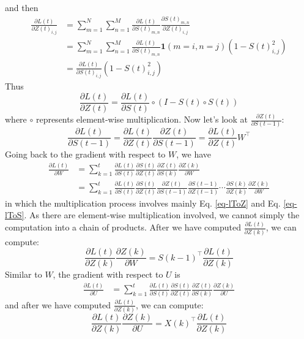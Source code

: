 \documentclass{article}
\begin{document}
and then 
\begin{align}
    \frac{\partial L(t)}{\partial Z(t)_{i, j}} 
    &= \sum_{m=1}^N\sum_{n=1}^M
    \frac{\partial L(t)}{\partial S(t)_{m, n}}
    \frac{\partial S(t)_{m, n}}{\partial Z(t)_{i, j}} \\
    &= \sum_{m=1}^N\sum_{n=1}^M
    \frac{\partial L(t)}{\partial S(t)_{m, n}}
    \mathbf{1}(m=i, n=j)(1 - S(t)_{i, j}^2) \\
    &= \frac{\partial L(t)}{\partial S(t)_{i, j}}
    (1 - S(t)_{i, j}^2)
\end{align}
Thus 
\begin{equation} \label{eq-lToZ}
    \frac{\partial L(t)}{\partial Z(t)} 
    = \frac{\partial L(t)}{\partial S(t)} \circ (I - S(t) \circ S(t))
\end{equation}
where $\circ$ represents element-wise multiplication. Now let's look at $\frac{\partial Z(t)}{\partial S(t-1)}$:
\begin{equation} \label{eq-lToS}
    \frac{\partial L(t)}{\partial S(t-1)} = \frac{\partial L(t)}{\partial Z(t)}\frac{\partial Z(t)}{\partial S(t-1)} = \frac{\partial L(t)}{\partial Z(t)}W^\top
\end{equation}
Going back to the gradient with respect to $W$, we have
\begin{align}
    \frac{\partial L(t)}{\partial W} 
    &= \sum_{k=1}^t 
    \frac{\partial L(t)}{\partial S(t)}
    \frac{\partial S(t)}{\partial Z(t)}
    \frac{\partial Z(t)}{\partial S(k)}
    \frac{\partial Z(k)}{\partial W} \\
    &= \sum_{k=1}^t 
    \frac{\partial L(t)}{\partial S(t)}
    \frac{\partial S(t)}{\partial Z(t)}
    \frac{\partial Z(t)}{\partial S(t-1)}
    \frac{\partial S(t-1)}{\partial Z(t-1)}
    \cdots
    \frac{\partial S(k)}{\partial Z(k)}
    \frac{\partial Z(k)}{\partial W}
\end{align}
in which the multiplication process involves mainly Eq. \eqref{eq-lToZ} and Eq. \eqref{eq-lToS}. As there are element-wise multiplication involved, we cannot simply the computation into a chain of products. After we have computed $\frac{\partial L(t)}{\partial Z(k)}$, we can compute:
\begin{equation}
   \frac{\partial L(t)}{\partial Z(k)} \frac{\partial Z(k)}{\partial W} = S(k-1)^\top\frac{\partial L(t)}{\partial Z(k)}
\end{equation}
Similar to $W$, the gradient with respect to $U$ is
\begin{align}
    \frac{\partial L(t)}{\partial U} 
    &= \sum_{k=1}^t 
    \frac{\partial L(t)}{\partial S(t)}
    \frac{\partial S(t)}{\partial Z(t)}
    \frac{\partial Z(t)}{\partial S(k)}
    \frac{\partial Z(k)}{\partial U}
\end{align}
and after we have computed $\frac{\partial L(t)}{\partial Z(k)}$, we can compute:
\begin{equation}
   \frac{\partial L(t)}{\partial Z(k)} \frac{\partial Z(k)}{\partial U} = X(k)^\top\frac{\partial L(t)}{\partial Z(k)}
\end{equation}
\end{document}
